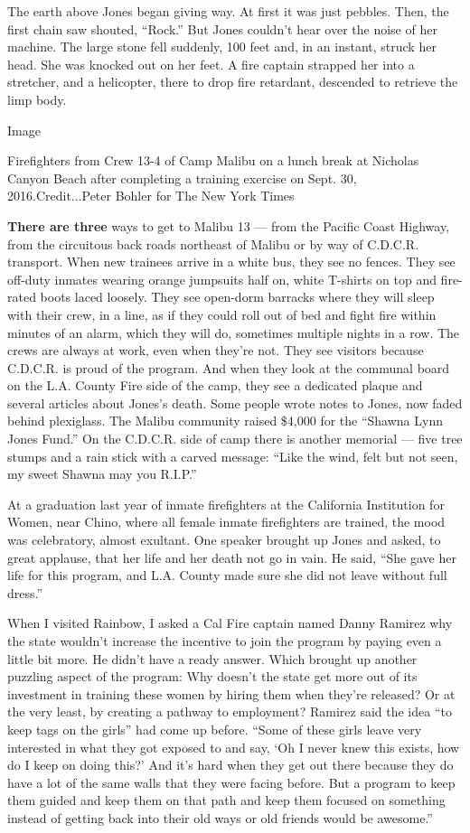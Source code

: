 The earth above Jones began giving way. At first it was just pebbles.
Then, the first chain saw shouted, ``Rock.'' But Jones couldn't hear
over the noise of her machine. The large stone fell suddenly, 100 feet
and, in an instant, struck her head. She was knocked out on her feet. A
fire captain strapped her into a stretcher, and a helicopter, there to
drop fire retardant, descended to retrieve the limp body.

Image

Firefighters from Crew 13-4 of Camp Malibu on a lunch break at Nicholas
Canyon Beach after completing a training exercise on Sept. 30,
2016.Credit...Peter Bohler for The New York Times

\textbf{There are three} ways to get to Malibu 13 --- from the Pacific
Coast Highway, from the circuitous back roads northeast of Malibu or by
way of C.D.C.R. transport. When new trainees arrive in a white bus, they
see no fences. They see off-duty inmates wearing orange jumpsuits half
on, white T-shirts on top and fire-rated boots laced loosely. They see
open-dorm barracks where they will sleep with their crew, in a line, as
if they could roll out of bed and fight fire within minutes of an alarm,
which they will do, sometimes multiple nights in a row. The crews are
always at work, even when they're not. They see visitors because
C.D.C.R. is proud of the program. And when they look at the communal
board on the L.A. County Fire side of the camp, they see a dedicated
plaque and several articles about Jones's death. Some people wrote notes
to Jones, now faded behind plexiglass. The Malibu community raised
\$4,000 for the ``Shawna Lynn Jones Fund.'' On the C.D.C.R. side of camp
there is another memorial --- five tree stumps and a rain stick with a
carved message: ``Like the wind, felt but not seen, my sweet Shawna may
you R.I.P.''

At a graduation last year of inmate firefighters at the California
Institution for Women, near Chino, where all female inmate firefighters
are trained, the mood was celebratory, almost exultant. One speaker
brought up Jones and asked, to great applause, that her life and her
death not go in vain. He said, ``She gave her life for this program, and
L.A. County made sure she did not leave without full dress.''

When I visited Rainbow, I asked a Cal Fire captain named Danny Ramirez
why the state wouldn't increase the incentive to join the program by
paying even a little bit more. He didn't have a ready answer. Which
brought up another puzzling aspect of the program: Why doesn't the state
get more out of its investment in training these women by hiring them
when they're released? Or at the very least, by creating a pathway to
employment? Ramirez said the idea ``to keep tags on the girls'' had come
up before. ``Some of these girls leave very interested in what they got
exposed to and say, `Oh I never knew this exists, how do I keep on doing
this?' And it's hard when they get out there because they do have a lot
of the same walls that they were facing before. But a program to keep
them guided and keep them on that path and keep them focused on
something instead of getting back into their old ways or old friends
would be awesome.''

